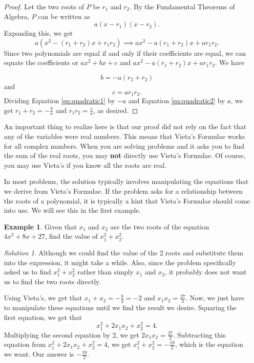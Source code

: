 \documentclass[l1pt]{article}
\theoremstyle{plain}
\theoremstyle{definition}
\newtheorem{example}[thm]{Example}
\theoremstyle{remark}
\newtheorem*{solution}{Solution}
\begin{document}
\begin{proof}
Let the two roots of $P$ be $r_1$ and $r_2$. By the Fundamental Theorems of Algebra, $P$ can be written as \[a(x-r_1)(x-r_2).\] Expanding this, we get \[a(x^2-(r_1+r_2)x+r_1 r_2) \implies ax^2-a(r_1+r_2)x+ar_1 r_2.\] Since two polynomials are equal if and only if their coefficients are equal, we can equate the coefficients or $ax^2+bx+c$ and $ax^2-a(r_1+r_2)x+ar_1 r_2$. We have 

\begin{equation}  \label{eq:quadratic1} b=-a(r_2+r_2) \end{equation} and 
\begin{equation}  \label{eq:quadratic2}  c=ar_1 r_2.  \end{equation}
Dividing Equation \ref{eq:quadratic1} by $-a$ and Equation \ref{eq:quadratic2} by $a$, we get $r_1+r_2=-\frac{b}{a}$ and $r_1 r_2=\frac{c}{a}$, as desired.

\end{proof}

An important thing to realize here is that our proof did not rely on the fact that any of the variables were real numbers. This means that Vieta's Formulae works for all complex numbers. When you are solving problems and it asks you to find the sum of the real roots, you may \textbf{not} directly use Vieta's Formulae. Of course, you may use Vieta's if you know all the roots are real. 

\bigskip

In most problems, the solution typically involves manipulating the equations that we derive from Vieta's Formulae. If the problem asks for a relationship between the roots of a polynomial, it is typically a hint that Vieta's Formulae should come into use. We will see this in the first example. 

\begin{example}
Given that $x_1$ and $x_2$ are the two roots of the equation $4x^2+8x+27$, find the value of $x_1 ^{2}+x_2 ^{2}.$
\end{example}

\begin{solution}
Although we could find the value of the 2 roots and substitute them into the expression, it might take a while. Also, since the problem specifically asked us to find $x_1 ^{2}+x_2 ^{2}$ rather than simply $x_1$ and $x_2$, it probably does not want us to find the two roots directly. 

Using Vieta's, we get that $x_1+x_2=-\frac{8}{4}=-2$ and $x_1 x_2=\frac{27}{4}$. Now, we just have to manipulate these equations until we find the result we desire. Squaring the first equation, we get that \[x_1 ^{2}+2x_1x_2+x_2^{2}=4.\] Multiplying the second equation by 2, we get $2x_1x_2=\frac{27}{2}$. Subtracting this equation from $x_1 ^{2}+2x_1x_2+x_2^{2}=4$, we get $x_1^{2}+x_2^{2}=-\frac{19}{2}$, which is the equation we want. Our answer is $-\frac{19}{2}$.
\end{solution}
\end{document}
